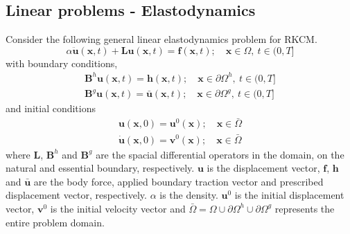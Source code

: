 \documentclass[10pt,letterpaper, onecolumn]{article}
\begin{document}
\subsection{Linear problems - Elastodynamics}
\label{section7.3.1}

Consider the following general linear elastodynamics problem for RKCM.
%
\begin{equation}
\alpha \ddot{\bm{u}}(\bm{x},t) + \bm{L}\bm{u}(\bm{x},t)  = \bm{f}(\bm{x},t) ; \quad \bm{x} \in \Omega, \ t \in (0,T]
\end{equation}
%
with boundary conditions,
%
\begin{subequations}
\begin{align}
\bm{B}^h\bm{u}(\bm{x},t)  = \bm{h}(\bm{x},t) ; \quad \bm{x} \in \partial \Omega^h, \ t \in (0,T] \\
\bm{B}^g\bm{u}(\bm{x},t)  = \bar{\bm{u}}(\bm{x},t); \quad \bm{x} \in \partial \Omega^g, \ t \in (0,T] 
\end{align}
\end{subequations}
%
and initial conditions
%
\begin{subequations}
\begin{align}
\bm{u}(\bm{x},0) = \bm{u}^0(\bm{x}); \quad \bm{x} \in \bar{\Omega} \\
\bm{\dot{u}}(\bm{x},0) = \bm{v}^0(\bm{x}); \quad \bm{x} \in \bar{\Omega}
\end{align}
\end{subequations}
%
where $\bm{L}$, $\bm{B}^h$ and $\bm{B}^g$ are the spacial differential operators in the domain, on the natural and essential boundary, respectively. $\bm{u}$ is the displacement vector, $\bm{f}$, $\bm{h}$ and $\bar{\bm{u}}$ are the body force, applied boundary traction vector and prescribed displacement vector, respectively. $\alpha$ is the density. $\bm{u}^0$ is the initial displacement vector, $\bm{v}^0$ is the initial velocity vector and $\bar{\Omega} = \Omega \cup \partial \Omega^h \cup \partial \Omega^g$ represents the entire problem domain. 
\end{document}
